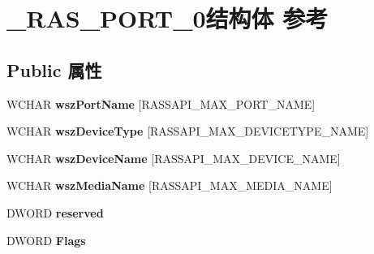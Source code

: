 \hypertarget{struct___r_a_s___p_o_r_t__0}{}\section{\+\_\+\+R\+A\+S\+\_\+\+P\+O\+R\+T\+\_\+0结构体 参考}
\label{struct___r_a_s___p_o_r_t__0}
\subsection*{Public 属性}
\begin{DoxyCompactItemize}
\item 
\mbox{\label{struct___r_a_s___p_o_r_t__0_ac325b5eebf1120b5b62040e2bb60e24c}} 
W\+C\+H\+AR {\bfseries wsz\+Port\+Name} \mbox{[}R\+A\+S\+S\+A\+P\+I\+\_\+\+M\+A\+X\+\_\+\+P\+O\+R\+T\+\_\+\+N\+A\+ME\mbox{]}
\item 
\mbox{\label{struct___r_a_s___p_o_r_t__0_a74de1141bdc1279bc2833b3432972539}} 
W\+C\+H\+AR {\bfseries wsz\+Device\+Type} \mbox{[}R\+A\+S\+S\+A\+P\+I\+\_\+\+M\+A\+X\+\_\+\+D\+E\+V\+I\+C\+E\+T\+Y\+P\+E\+\_\+\+N\+A\+ME\mbox{]}
\item 
\mbox{\label{struct___r_a_s___p_o_r_t__0_a347fc990dfab4d090ae3623d19bd8099}} 
W\+C\+H\+AR {\bfseries wsz\+Device\+Name} \mbox{[}R\+A\+S\+S\+A\+P\+I\+\_\+\+M\+A\+X\+\_\+\+D\+E\+V\+I\+C\+E\+\_\+\+N\+A\+ME\mbox{]}
\item 
\mbox{\label{struct___r_a_s___p_o_r_t__0_aadfaef517bf993c863f76613904959a4}} 
W\+C\+H\+AR {\bfseries wsz\+Media\+Name} \mbox{[}R\+A\+S\+S\+A\+P\+I\+\_\+\+M\+A\+X\+\_\+\+M\+E\+D\+I\+A\+\_\+\+N\+A\+ME\mbox{]}
\item 
\mbox{\label{struct___r_a_s___p_o_r_t__0_a18dec1233afb470cce899897e7b50e91}} 
D\+W\+O\+RD {\bfseries reserved}
\item 
\mbox{\label{struct___r_a_s___p_o_r_t__0_a8e5442392480e498fbead5474ffa5078}} 
D\+W\+O\+RD {\bfseries Flags}
\item 
\mbox{\label{struct___r_a_s___p_o_r_t__0_a1944c9feebcc8115f59340dc97c8cb62}} 

\end{DoxyCompactItemize}
